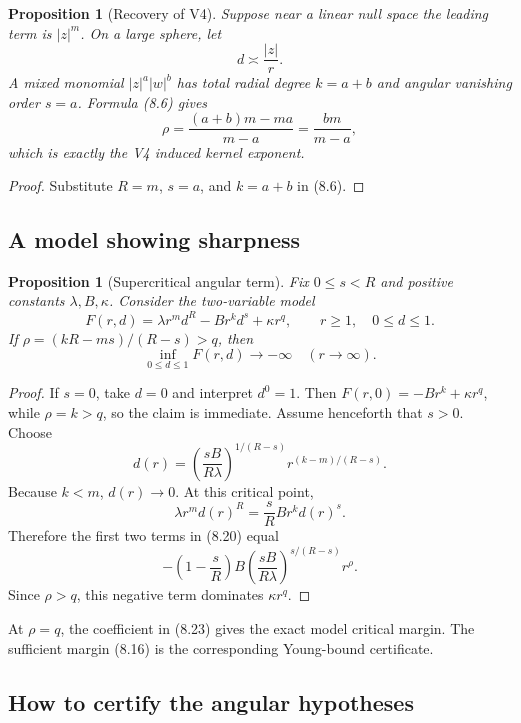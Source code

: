 \documentclass[11pt]{article}
\newtheorem{proposition}[theorem]{Proposition}
\theoremstyle{remark}
\begin{document}
\begin{proposition}[Recovery of V4]
\label{prop:v17v8-v4}
Suppose near a linear null space the leading term is
\(|z|^m\).  On a large sphere, let
\[
 d\asymp\frac{|z|}{r}.
\]
A mixed monomial \(|z|^a|w|^b\) has total radial degree
\(k=a+b\) and angular vanishing order \(s=a\).  Formula (8.6) gives
\[
 \rho=
 \frac{(a+b)m-ma}{m-a}
 =
 \frac{bm}{m-a},                                   \tag{8.19}
\]
which is exactly the V4 induced kernel exponent.
\end{proposition}

\begin{proof}
Substitute \(R=m\), \(s=a\), and \(k=a+b\) in (8.6).
\end{proof}

\subsection{A model showing sharpness}

\begin{proposition}[Supercritical angular term]
\label{prop:v17v8-sharp}
Fix \(0\leq s<R\) and positive constants
\(\lambda,B,\kappa\).  Consider the two-variable model
\[
 F(r,d)=
 \lambda r^md^R-Br^kd^s+\kappa r^q,
 \qquad r\geq1,\quad0\leq d\leq1.                  \tag{8.20}
\]
If \(\rho=(kR-ms)/(R-s)>q\), then
\[
 \inf_{0\leq d\leq1}F(r,d)\longrightarrow-\infty
 \quad(r\to\infty).                                \tag{8.21}
\]
\end{proposition}

\begin{proof}
If \(s=0\), take \(d=0\) and interpret \(d^0=1\).  Then
\(F(r,0)=-Br^k+\kappa r^q\), while \(\rho=k>q\), so the claim
is immediate.  Assume henceforth that \(s>0\).
Choose
\[
 d(r)=
 \left(\frac{sB}{R\lambda}\right)^{1/(R-s)}
 r^{(k-m)/(R-s)}.                                  \tag{8.22}
\]
Because \(k<m\), \(d(r)\to0\).  At this critical point,
\[
 \lambda r^md(r)^R
 =
 \frac{s}{R}Br^kd(r)^s.
\]
Therefore the first two terms in (8.20) equal
\[
 -\left(1-\frac{s}{R}\right)
 B\left(\frac{sB}{R\lambda}\right)^{s/(R-s)}
 r^\rho.                                           \tag{8.23}
\]
Since \(\rho>q\), this negative term dominates
\(\kappa r^q\).
\end{proof}

At \(\rho=q\), the coefficient in (8.23) gives the exact model
critical margin.  The sufficient margin (8.16) is the corresponding
Young-bound certificate.

\subsection{How to certify the angular hypotheses}
\end{document}
